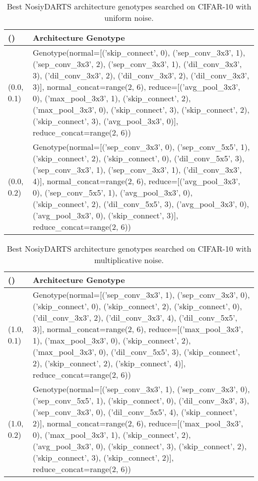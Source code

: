\documentclass{article}
\begin{document}
\begin{table}[ht]
	\begin{center}
		\caption{Best NosiyDARTS architecture genotypes searched on CIFAR-10 with uniform noise.}
		\label{table:genotypes-uniform-noise}
		\begin{tabular}{lp{330pt}}
			\toprule
			() &  Architecture Genotype \\
			\midrule
			(0.0, 0.1) & Genotype(normal=[('skip\_connect', 0), ('sep\_conv\_3x3', 1), ('sep\_conv\_3x3', 2), ('sep\_conv\_3x3', 1), ('dil\_conv\_3x3', 3), ('dil\_conv\_3x3', 2), ('dil\_conv\_3x3', 2), ('dil\_conv\_3x3', 3)], normal\_concat=range(2, 6), reduce=[('avg\_pool\_3x3', 0), ('max\_pool\_3x3', 1), ('skip\_connect', 2), ('max\_pool\_3x3', 0), ('skip\_connect', 3), ('skip\_connect', 2), ('skip\_connect', 3), ('avg\_pool\_3x3', 0)], reduce\_concat=range(2, 6)) \\ (0.0, 0.2) & Genotype(normal=[('sep\_conv\_3x3', 0), ('sep\_conv\_5x5', 1), ('skip\_connect', 2), ('skip\_connect', 0), ('dil\_conv\_5x5', 3), ('sep\_conv\_3x3', 1), ('sep\_conv\_3x3', 1), ('dil\_conv\_3x3', 4)], normal\_concat=range(2, 6), reduce=[('avg\_pool\_3x3', 0), ('sep\_conv\_5x5', 1), ('avg\_pool\_3x3', 0), ('skip\_connect', 2), ('dil\_conv\_5x5', 3), ('avg\_pool\_3x3', 0), ('avg\_pool\_3x3', 0), ('skip\_connect', 3)], reduce\_concat=range(2, 6)) \\ \bottomrule
		\end{tabular}
	\end{center}
\end{table}

\begin{table}[ht]
	\begin{center}
		\caption{Best NosiyDARTS architecture genotypes searched on CIFAR-10 with multiplicative noise.}
		\label{table:genotypes-multi-noise}
		\begin{tabular}{lp{330pt}}
			\toprule
			() &  Architecture Genotype \\
			\midrule
			(1.0, 0.1) & Genotype(normal=[('sep\_conv\_3x3', 1), ('sep\_conv\_3x3', 0), ('skip\_connect', 0), ('skip\_connect', 2), ('skip\_connect', 0), ('dil\_conv\_3x3', 2), ('dil\_conv\_3x3', 4), ('dil\_conv\_5x5', 3)], normal\_concat=range(2, 6), reduce=[('max\_pool\_3x3', 1), ('max\_pool\_3x3', 0), ('skip\_connect', 2), ('max\_pool\_3x3', 0), ('dil\_conv\_5x5', 3), ('skip\_connect', 2), ('skip\_connect', 2), ('skip\_connect', 4)], reduce\_concat=range(2, 6)) \\ (1.0, 0.2) & Genotype(normal=[('sep\_conv\_3x3', 1), ('sep\_conv\_3x3', 0), ('sep\_conv\_5x5', 1), ('skip\_connect', 0), ('dil\_conv\_3x3', 3), ('sep\_conv\_3x3', 0), ('dil\_conv\_5x5', 4), ('skip\_connect', 2)], normal\_concat=range(2, 6), reduce=[('max\_pool\_3x3', 0), ('max\_pool\_3x3', 1), ('skip\_connect', 2), ('avg\_pool\_3x3', 0), ('skip\_connect', 3), ('skip\_connect', 2), ('skip\_connect', 3), ('skip\_connect', 2)], reduce\_concat=range(2, 6)) \\\bottomrule
		\end{tabular}
	\end{center}
\end{table}
\end{document}
